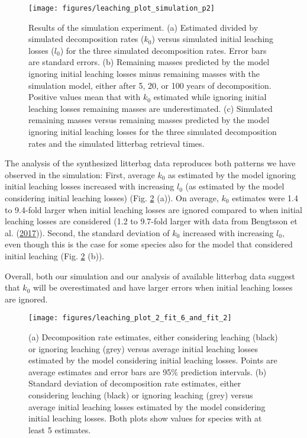 \documentclass[
  12pt,
]{article}
\begin{document}
\begin{figure}[H]

{\centering \texttt{[image: figures/leaching\_plot\_simulation\_p2]} 

}

\caption{Results of the simulation experiment. (a) Estimated divided by simulated decomposition rates (\(k_0\)) versus simulated initial leaching losses (\(l_0\)) for the three simulated decomposition rates. Error bars are standard errors. (b) Remaining masses predicted by the model ignoring initial leaching losses minus remaining masses with the simulation model, either after 5, 20, or 100 years of decomposition. Positive values mean that with \(k_0\) estimated while ignoring initial leaching losses remaining masses are underestimated. (c) Simulated remaining masses versus remaining masses predicted by the model ignoring initial leaching losses for the three simulated decomposition rates and the simulated litterbag retrieval times.}\label{fig:out-p-simulation-p2}
\end{figure}

The analysis of the synthesized litterbag data reproduces both patterns we have observed in the simulation: First, average \(k_0\) as estimated by the model ignoring initial leaching losses increased with increasing \(l_0\) (as estimated by the model considering initial leaching losses) (Fig. \ref{fig:out-mm27-1-mm28-1-p2} (a)). On average, \(k_0\) estimates were 1.4 to 9.4-fold larger when initial leaching losses are ignored compared to when initial leaching losses are considered (1.2 to 9.7-fold larger with data from Bengtsson et al. (\protect\hyperlink{ref-Bengtsson.2017}{2017})). Second, the standard deviation of \(k_0\) increased with increasing \(l_0\), even though this is the case for some species also for the model that considered initial leaching (Fig. \ref{fig:out-mm27-1-mm28-1-p2} (b)).

Overall, both our simulation and our analysis of available litterbag data suggest that \(k_0\) will be overestimated and have larger errors when initial leaching losses are ignored.



\begin{figure}[H]

{\centering \texttt{[image: figures/leaching\_plot\_2\_fit\_6\_and\_fit\_2]} 

}

\caption{(a) Decomposition rate estimates, either considering leaching (black) or ignoring leaching (grey) versus average initial leaching losses estimated by the model considering initial leaching losses. Points are average estimates and error bars are 95\% prediction intervals. (b) Standard deviation of decomposition rate estimates, either considering leaching (black) or ignoring leaching (grey) versus average initial leaching losses estimated by the model considering initial leaching losses. Both plots show values for species with at least 5 estimates.}\label{fig:out-mm27-1-mm28-1-p2}
\end{figure}
\end{document}
